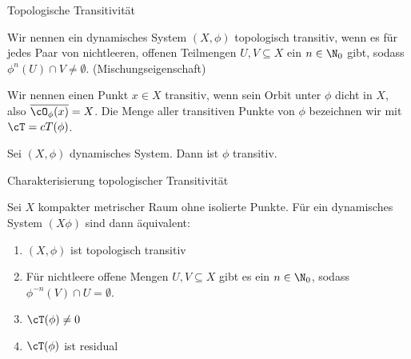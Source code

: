 \begin{definition} Topologische Transitivität

Wir nennen ein dynamisches System $( X, \phi)$ topologisch transitiv, wenn es für jedes Paar von nichtleeren, offenen Teilmengen $U, V \subseteq X$ ein $n \in \N_0$ gibt, sodass $\phi^n(U) \cap V \neq \emptyset$. 
  (Mischungseigenschaft)

Wir nennen einen Punkt $x \in X$ transitiv, wenn sein Orbit unter $\phi$ dicht in $X$, also $\overline {\cO_\phi(x)}= X$. Die Menge aller transitiven Punkte von $\phi$ bezeichnen wir mit $\cT = cT(\phi)$.
\end{definition}
\begin{uebung}
  Sei $(X, \phi)$ dynamisches System. Dann ist $\phi$ transitiv.
\end{uebung}
\begin{lemma} Charakterisierung topologischer Transitivität

Sei $X$ kompakter metrischer Raum ohne isolierte Punkte. Für ein dynamisches System $(X \phi)$ sind dann äquivalent:
\begin{enumerate}
\item $(X, \phi)$ ist topologisch transitiv
\item Für nichtleere offene Mengen $U, V \subseteq X$ gibt es ein $n \in \N_0$, sodass $\phi^{-n}(V) \cap U  = \emptyset$.
\item $\cT(\phi) \neq 0$
\item $\cT(\phi)$ ist residual
\end{enumerate}
\end{lemma}
